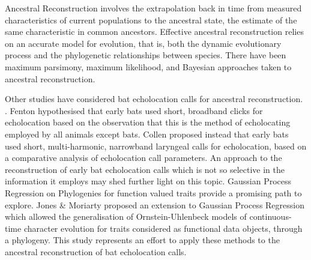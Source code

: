 \documentclass[wsdraft]{ws-rv9x6} %
\begin{document}
Ancestral Reconstruction involves the extrapolation back in time from measured characteristics of current populations to the ancestral state, the estimate of the same characteristic in common ancestors.\cite{joy2016ancestral} Effective ancestral reconstruction relies on an accurate model for evolution, that is, both the dynamic evolutionary process and the phylogenetic relationships between species. \cite{joy2016ancestral} There have been maximum parsimony\cite{fitch1971toward}, maximum likelihood\cite{pupko2000fast}, and Bayesian\cite{pagel2004bayesian} approaches taken to ancestral reconstruction.

Other studies have considered bat echolocation calls for ancestral reconstruction. \cite{fenton1995signal} \cite{collen2012evolution}. Fenton\cite{fenton1995signal} hypothesised that early bats used short, broadband clicks for echolocation based on the observation that this is the method of echolocating employed by all animals except bats. Collen\cite{collen2012evolution} proposed instead that early bats used short, multi-harmonic, narrowband laryngeal calls for echolocation, based on a comparative analysis of echolocation call parameters. An approach to the reconstruction of early bat echolocation calls which is not so selective in the information it employs may shed further light on this topic. Gaussian Process Regression on Phylogenies for function valued traits provide a promising path to explore.\cite{jones2013evolutionary} Jones \& Moriarty proposed an extension to Gaussian Process Regression\cite{rasmussen2006gaussian} which allowed the generalisation of Ornstein-Uhlenbeck\cite{uhlenbeck1930theory} models of continuous-time character evolution for traits considered as functional data objects,\cite{ramsay2006functional} through a phylogeny. This study represents an effort to apply these methods to the ancestral reconstruction of bat echolocation calls.
\end{document}
